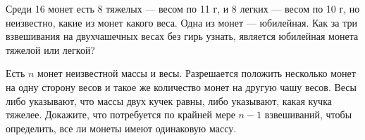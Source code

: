 \newpage

\centerline{\Huge \bf}

Среди 16 монет есть 8 тяжелых — весом по 11 г, и 8 легких — весом по 10
г, но неизвестно, какие из монет какого веса. Одна из монет — юбилейная.
Как за три взвешивания на двухчашечных весах без гирь узнать, является
юбилейная монета тяжелой или легкой?

Есть $n$ монет неизвестной массы и весы. Разрешается положить несколько
монет на одну сторону весов и такое же количество монет на другую чашу
весов. Весы либо указывают, что массы двух кучек равны, либо указывают,
какая кучка тяжелее. Докажите, что потребуется по крайней мере $n - 1$
взвешиваний, чтобы определить, все ли монеты имеют одинаковую массу.